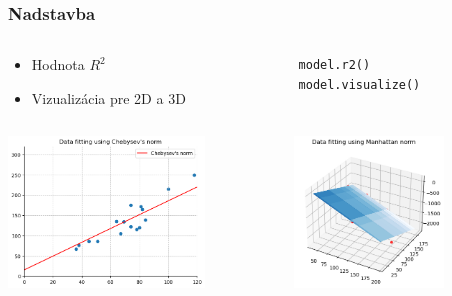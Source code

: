 \documentclass[presentation.tex]{subfiles}
\begin{document}
    \begin{frame}[fragile]
        \frametitle{Nadstavba}
        \begin{columns}
        	\begin{column}{0.5\textwidth}
        		\begin{itemize}
        			\item Hodnota $R^2$
        			\item Vizualizácia pre 2D a 3D
        		\end{itemize}
        	\end{column}
        	\begin{column}{0.5\textwidth}
        		\vspace{0.4cm}
        		\begin{lstlisting}            	
model.r2()
model.visualize()
        		\end{lstlisting}
        	\end{column}
        \end{columns}

        \begin{columns}
            \begin{column}{0.5\textwidth}
            	\centering
                \includegraphics[height=4cm, keepaspectratio]{2D_viz.png}
            \end{column}
            \begin{column}{0.5\textwidth}
            	\centering
                \includegraphics[height=4cm, keepaspectratio]{3D_viz.png}
            \end{column}
        \end{columns}
    \end{frame}
\end{document}
